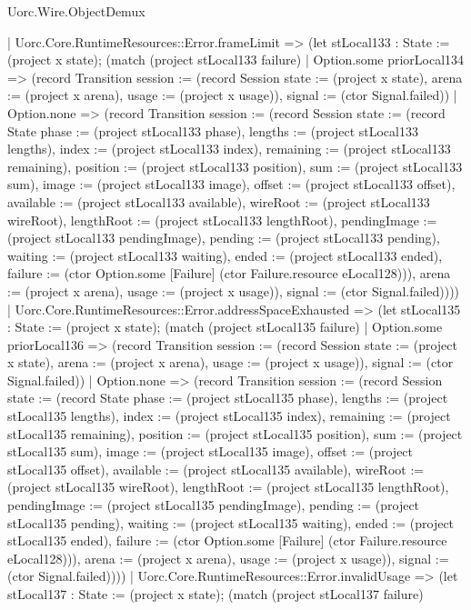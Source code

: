 \begin{lexlean}{Uorc.Wire.ObjectDemux}
\begin{semanticmodule}
{      | Uorc.Core.RuntimeResources::Error.frameLimit => (let stLocal133 : State := (project x state); (match (project stLocal133 failure)
        | Option.some priorLocal134 => (record Transition {session := (record Session {state := (project x state), arena := (project x arena), usage := (project x usage)}), signal := (ctor Signal.failed)})
        | Option.none => (record Transition {session := (record Session {state := (record State {phase := (project stLocal133 phase), lengths := (project stLocal133 lengths), index := (project stLocal133 index), remaining := (project stLocal133 remaining), position := (project stLocal133 position), sum := (project stLocal133 sum), image := (project stLocal133 image), offset := (project stLocal133 offset), available := (project stLocal133 available), wireRoot := (project stLocal133 wireRoot), lengthRoot := (project stLocal133 lengthRoot), pendingImage := (project stLocal133 pendingImage), pending := (project stLocal133 pending), waiting := (project stLocal133 waiting), ended := (project stLocal133 ended), failure := (ctor Option.some [Failure] (ctor Failure.resource eLocal128))}), arena := (project x arena), usage := (project x usage)}), signal := (ctor Signal.failed)})))
      | Uorc.Core.RuntimeResources::Error.addressSpaceExhausted => (let stLocal135 : State := (project x state); (match (project stLocal135 failure)
        | Option.some priorLocal136 => (record Transition {session := (record Session {state := (project x state), arena := (project x arena), usage := (project x usage)}), signal := (ctor Signal.failed)})
        | Option.none => (record Transition {session := (record Session {state := (record State {phase := (project stLocal135 phase), lengths := (project stLocal135 lengths), index := (project stLocal135 index), remaining := (project stLocal135 remaining), position := (project stLocal135 position), sum := (project stLocal135 sum), image := (project stLocal135 image), offset := (project stLocal135 offset), available := (project stLocal135 available), wireRoot := (project stLocal135 wireRoot), lengthRoot := (project stLocal135 lengthRoot), pendingImage := (project stLocal135 pendingImage), pending := (project stLocal135 pending), waiting := (project stLocal135 waiting), ended := (project stLocal135 ended), failure := (ctor Option.some [Failure] (ctor Failure.resource eLocal128))}), arena := (project x arena), usage := (project x usage)}), signal := (ctor Signal.failed)})))
      | Uorc.Core.RuntimeResources::Error.invalidUsage => (let stLocal137 : State := (project x state); (match (project stLocal137 failure)
}
\end{semanticmodule}
\end{lexlean}
